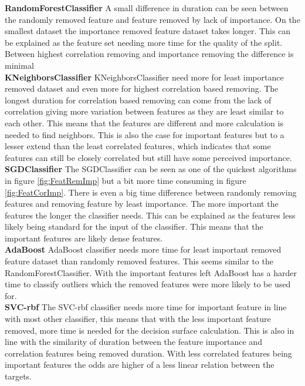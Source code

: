 \documentclass[a4paper,10pt]{article}
\begin{document}
\textbf{RandomForestClassifier} A small difference in duration can be seen between the randomly removed feature and feature removed by lack of importance. On the smallest dataset the importance removed feature dataset takes longer. This can be explained as the feature set needing more time for the quality of the split. Between highest correlation removing and importance removing the difference is minimal\\

\textbf{KNeighborsClassifier} KNeighborsClassifier need more for least importance removed dataset and even more for highest correlation based removing. The longest duration for correlation based removing can come from the lack of correlation giving more variation between features as they are least similar to each other. This means that the features are different and more calculation is needed to find neighbors. This is also the case for important features but to a lesser extend than the least correlated features, which indicates that some features can still be closely correlated but still have some perceived importance.\\

\textbf{SGDClassifier} The SGDClassifier can be seen as one of the quickest algorithms in figure \ref{fig:FeatRemImp} but a bit more time consuming in figure \ref{fig:FeatCorImp}. There is even a big time difference between randomly removing features and removing feature by least importance. The more important the features the longer the classifier needs. This can be explained as the features less likely being standard for the input of the classifier. This means that the important features are likely dense features. \\

\textbf{AdaBoost} AdaBoost classifier needs more time for least important removed feature dataset than randomly removed features. This seems similar to the RandomForestClassifier. With the important features left AdaBoost has a harder time to classify outliers which the removed features were more likely to be used for. \\

\textbf{SVC-rbf} The SVC-rbf classifier needs more time for important feature in line with most other classifier, this means that with the less important feature removed, more time is needed for the decision surface calculation. This is also in line with the similarity of duration between the feature importance and correlation features being removed duration. With less correlated features being important features the odds are higher of a less linear relation between the targets. \\
\end{document}
